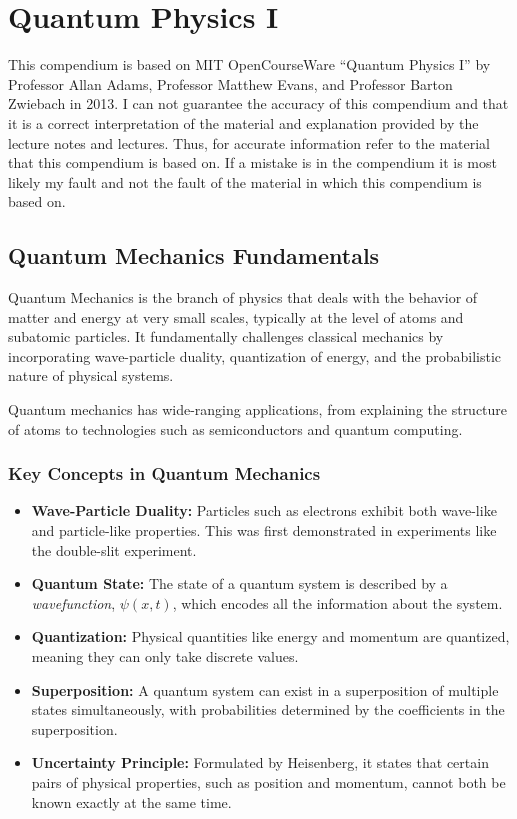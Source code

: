 \chapter{Quantum Physics I}
This compendium is based on MIT OpenCourseWare ``Quantum Physics I'' by Professor Allan Adams, Professor Matthew Evans, and Professor Barton Zwiebach in 2013.
I can not guarantee the accuracy of this compendium and that it is a correct interpretation of the material and explanation provided by the lecture notes and lectures. Thus, for accurate information refer to the material that this compendium is based on. If a mistake is in the compendium it is most likely my fault and not the fault of the material in which this compendium is based on.


\section{Quantum Mechanics Fundamentals}

Quantum Mechanics is the branch of physics that deals with the behavior of matter and energy at very small scales, typically at the level of atoms and subatomic particles. It fundamentally challenges classical mechanics by incorporating wave-particle duality, quantization of energy, and the probabilistic nature of physical systems.

Quantum mechanics has wide-ranging applications, from explaining the structure of atoms to technologies such as semiconductors and quantum computing.

\subsection{Key Concepts in Quantum Mechanics}
\begin{itemize}
    \item \textbf{Wave-Particle Duality:} Particles such as electrons exhibit both wave-like and particle-like properties. This was first demonstrated in experiments like the double-slit experiment.
    \item \textbf{Quantum State:} The state of a quantum system is described by a \textit{wavefunction}, $\psi(x,t)$, which encodes all the information about the system.
    \item \textbf{Quantization:} Physical quantities like energy and momentum are quantized, meaning they can only take discrete values.
    \item \textbf{Superposition:} A quantum system can exist in a superposition of multiple states simultaneously, with probabilities determined by the coefficients in the superposition.
    \item \textbf{Uncertainty Principle:} Formulated by Heisenberg, it states that certain pairs of physical properties, such as position and momentum, cannot both be known exactly at the same time.
\end{itemize}

